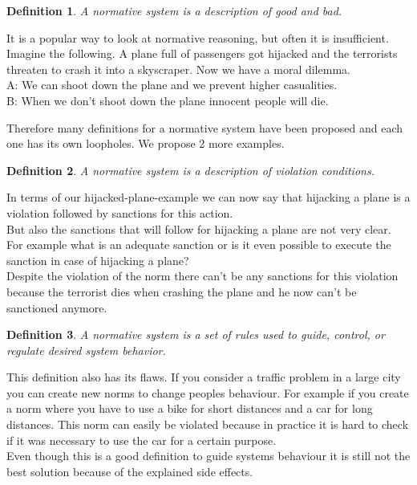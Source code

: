 \documentclass[conference]{IEEE}
\newtheorem{definition}{Definition}
\begin{document}
\begin{definition}
A normative system is a description of good and
bad. \cite{b2}
\end{definition}

It is a popular way to look at normative reasoning, but often it is insufficient. Imagine the following. A plane full of passengers got hijacked and the terrorists threaten to crash it into a skyscraper. Now we have a moral dilemma.\\
A: We can shoot down the plane and we prevent higher casualities.\\
B: When we don't shoot down the plane innocent people will die.

Therefore many definitions for a normative system have been proposed and each one has its own loopholes. We propose 2 more examples.\\


\begin{definition}
A normative system is a description
of violation conditions. \cite{b2}\\
\end{definition}

In terms of our hijacked-plane-example we can now say that hijacking a plane is a violation followed by sanctions for this action.\\
But also the sanctions that will follow for hijacking a plane are not very clear. For example what is an adequate sanction or is it even possible to execute the sanction in case of hijacking a plane?\\
Despite the violation of the norm there can't be any sanctions for this violation because the terrorist dies when crashing the plane and he now can't be sanctioned anymore.\\

\begin{definition}
A normative system is a set of rules used to guide,
control, or regulate desired system behavior.\cite{b2}\\
\end{definition}

This definition also has its flaws. If you consider a traffic problem in a large city you can create new norms to change peoples behaviour. For example if you create a norm where you have to use a bike for short distances and a car for long distances. This norm can easily be violated because in practice it is hard to check if it was necessary to use the car for a certain purpose.\\
Even though this is a good definition to guide systems behaviour it is still not the best solution because of the explained side effects.
\end{document}
